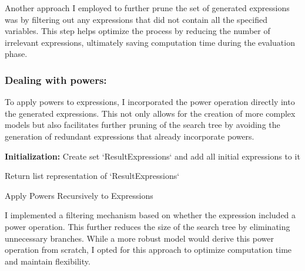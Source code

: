 \documentclass{article}
\begin{document}
Another approach I employed to further prune the set of generated expressions was by filtering out any expressions that did not contain all the specified variables. This step helps optimize the process by reducing the number of irrelevant expressions, ultimately saving computation time during the evaluation phase.\\


\subsubsection{Dealing with powers:}

To apply powers to expressions, I incorporated the power operation directly into the generated expressions. This not only allows for the creation of more complex models but also facilitates further pruning of the search tree by avoiding the generation of redundant expressions that already incorporate powers.\\



\begin{algorithm}[H]
\SetAlgoLined
{}

\textbf{Initialization:}\;
Create set `ResultExpressions` and add all initial expressions to it\;


Return list representation of `ResultExpressions`\;

\caption{Apply Powers Recursively to Expressions}
\label{alg:apply_powers} %
\end{algorithm}




I implemented a filtering mechanism based on whether the expression included a power operation. This further reduces the size of the search tree by eliminating unnecessary branches. While a more robust model would derive this power operation from scratch, I opted for this approach to optimize computation time and maintain flexibility.\\
\end{document}
